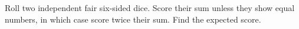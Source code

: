 Roll two independent fair six-sided dice. Score their sum unless they show equal numbers, in which case score twice their sum. Find the expected score.
